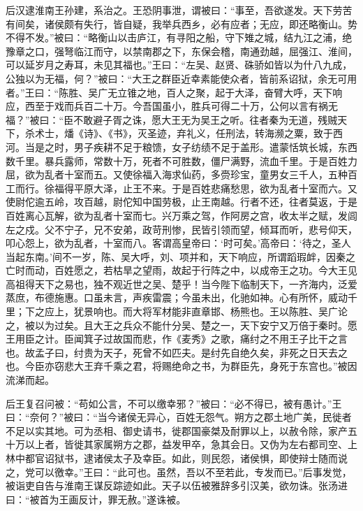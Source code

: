 \documentclass[12pt,UTF8]{ctexbook}
\begin{document}
后汉逮淮南王孙建，系治之。王恐阴事泄，谓被曰：“事至，吾欲遂发。天下劳苦有间矣，诸侯颇有失行，皆自疑，我举兵西乡，必有应者；无应，即还略衡山。势不得不发。”被曰：“略衡山以击庐江，有寻阳之船，守下雉之城，结九江之浦，绝豫章之口，强弩临江而守，以禁南郡之下，东保会稽，南通劲越，屈强江、淮间，可以延岁月之寿耳，未见其福也。”王曰：“左吴、赵贤、硃骄如皆以为什八九成，公独以为无福，何？”被曰：“大王之群臣近幸素能使众者，皆前系诏狱，余无可用者。”王曰：“陈胜、吴广无立锥之地，百人之聚，起于大泽，奋臂大呼，天下响应，西至于戏而兵百二十万。今吾国虽小，胜兵可得二十万，公何以言有祸无福？”被曰：“臣不敢避子胥之诛，愿大王无为吴王之听。往者秦为无道，残贼天下，杀术士，燔《诗》、《书》，灭圣迹，弃礼义，任刑法，转海濒之粟，致于西河。当是之时，男子疾耕不足于粮馈，女子纺绩不足于盖形。遣蒙恬筑长城，东西数千里。暴兵露师，常数十万，死者不可胜数，僵尸满野，流血千里。于是百姓力屈，欲为乱者十室而五。又使徐福入海求仙药，多赍珍宝，童男女三千人，五种百工而行。徐福得平原大泽，止王不来。于是百姓悲痛愁思，欲为乱者十室而六。又使尉佗逾五岭，攻百越，尉佗知中国劳极，止王南越。行者不还，往者莫返，于是百姓离心瓦解，欲为乱者十室而七。兴万乘之驾，作阿房之宫，收太半之赋，发闾左之戍。父不宁子，兄不安弟，政苛刑惨，民皆引领而望，倾耳而听，悲号仰天，叩心怨上，欲为乱者，十室而八。客谓高皇帝曰：‘时可矣。’高帝曰：‘待之，圣人当起东南。’间不一岁，陈、吴大呼，刘、项并和，天下响应，所谓蹈瑕衅，因秦之亡时而动，百姓愿之，若枯旱之望雨，故起于行阵之中，以成帝王之功。今大王见高祖得天下之易也，独不观近世之吴、楚乎！当今陛下临制天下，一齐海内，泛爱蒸庶，布德施惠。口虽未言，声疾雷震；今虽未出，化驰如神。心有所怀，威动千里；下之应上，犹景响也。而大将军材能非直章邯、杨熊也。王以陈胜、吴广论之，被以为过矣。且大王之兵众不能什分吴、楚之一，天下安宁又万倍于秦时。愿王用臣之计。臣闻箕子过故国而悲，作《麦秀》之歌，痛纣之不用王子比干之言也。故孟子曰，纣贵为天子，死曾不如匹夫。是纣先自绝久矣，非死之日天去之也。今臣亦窃悲大王弃千乘之君，将赐绝命之书，为群臣先，身死于东宫也。”被因流涕而起。



后王复召问被：“苟如公言，不可以缴幸邪？”被曰：“必不得已，被有愚计。”王曰：“奈何？”被曰：“当今诸侯无异心，百姓无怨气。朔方之郡土地广美，民徙者不足以实其地。可为丞相、御史请书，徙郡国豪桀及耐罪以上，以赦令除，家产五十万以上者，皆徙其家属朔方之郡，益发甲卒，急其会日。又伪为左右都司空、上林中都官诏狱书，逮诸侯太子及幸臣。如此，则民怨，诸侯惧，即使辩士随而说之，党可以徼幸。”王曰：“此可也。虽然，吾以不至若此，专发而已。”后事发觉，被诣吏自告与淮南王谋反踪迹如此。天子以伍被雅辞多引汉美，欲勿诛。张汤进曰：“被首为王画反计，罪无赦。”遂诛被。
\end{document}
